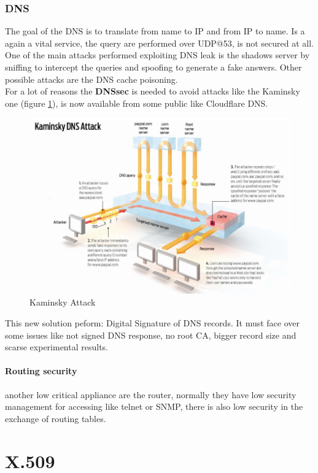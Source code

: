 \documentclass[12pt]{article}
\begin{document}
\subsubsection{DNS}
The goal of the DNS is to translate from name to IP and from IP to name. Is a again a vital service, the query are performed over UDP@53, is not secured at all.\\
One of the main attacks performed exploiting DNS leak is the shadows server by sniffing to intercept the queries and spoofing to generate a fake answers. Other possible attacks are the DNS cache poisoning.\\
For a lot of reasons the \textbf{DNSsec} is needed to avoid attacks like the Kaminsky one (figure \ref{fig:kaminsky}), is now available from some public like Cloudflare DNS.
\begin{figure}[H]
   \centering
   \includegraphics[width=\linewidth]{images/kaminsky.png}
   \caption{Kaminsky Attack}
   \label{fig:kaminsky}
\end{figure}
This new solution peform: Digital Signature of DNS records. It must face over some issues like not signed DNS response, no root CA, bigger record size and scarse experimental results.

\paragraph{Routing security} another low critical appliance are the router, normally they have low security management for accessing like telnet or SNMP, there is also low security in the exchange of routing tables.

\section{X.509}
\end{document}
